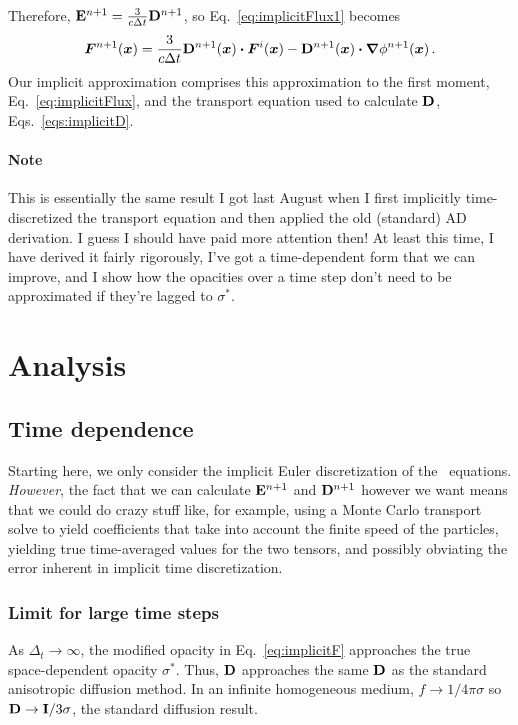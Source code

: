 Therefore, $\mathbf{E}^{n+1} =  \frac{3}{c \Delta t} \mathbf{D}^{n+1}$, so
Eq.~\eqref{eq:implicitFlux1} becomes
\begin{equation}\label{eq:implicitFlux}
  \bm{F}^{n+1}(\bm{x}) =  \frac{3}{c \Delta t} \mathbf{D}^{n+1} (\bm{x}) \bm{\cdot}
  \bm{F}^i(\bm{x})
  - \mathbf{D}^{n+1}(\bm{x}) \bm{\cdot} \bm{\nabla} \phi^{n+1} (\bm{x}) \,.
\end{equation}
Our implicit approximation comprises this approximation to the first moment,
Eq.~\eqref{eq:implicitFlux}, and the transport equation used to calculate
$\mathbf{D}$, Eqs.~\eqref{eqs:implicitD}.

\paragraph{Note} This is essentially the same result I got last August when I
first implicitly time-discretized the transport equation and then applied the
old (standard) AD derivation. I guess I should have paid more attention then!
At least this time, I have derived it fairly rigorously, I've got a
time-dependent form that we can improve, and I show how the opacities over a
time step don't need to be approximated if they're lagged to $\sigma^\ast$.

\section{Analysis}


\subsection{Time dependence}
Starting here, we only consider the implicit Euler discretization of the
\APone\ equations. \emph{However}, the fact that we can calculate
$\mathbf{E}^{n+1}$ and $\mathbf{D}^{n+1}$ however we want means that we could do crazy
stuff like, for example, using a Monte Carlo transport solve to yield
coefficients that take into account the finite speed of the particles, yielding
true time-averaged values for the two tensors, and possibly obviating the error
inherent in implicit time discretization.

\subsubsection{Limit for large time steps}
As $\Delta_t\to \infty$, the modified opacity in Eq.~\eqref{eq:implicitF}
approaches the true space-dependent opacity $\sigma^\ast$. Thus, $\mathbf{D}$
approaches the same $\mathbf{D}$ as the standard anisotropic diffusion method. In
an infinite homogeneous medium, $f\to 1/4\pi \sigma$ so $\mathbf{D} \to
\mathbf{I}/3\sigma$, the standard diffusion result.

